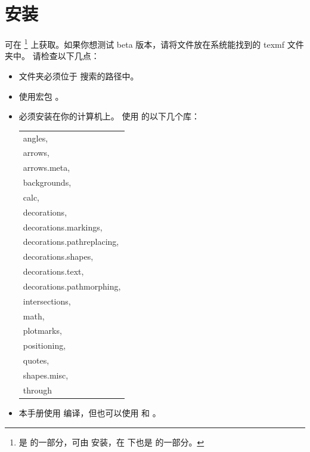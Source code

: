 \section{安装}

\tkzname{\tkznameofpack} 可在 \footnote{\tkzname{\tkznameofpack} 是  的一部分，可由  安装，在  下也是  的一部分。} 上获取。如果你想测试 beta 版本，请将文件放在系统能找到的 texmf 文件夹中。
请检查以下几点：

\begin{itemize}\setlength{\itemsep}{5pt}
\item \tkzname{\tkznameofpack} 文件夹必须位于  搜索的路径中。
\item \tkzname{\tkznameofpack} 使用宏包 。
\item \PGF 必须安装在你的计算机上。\tkzname{\tkznameofpack} 使用 \TIKZ 的以下几个库：

 \begin{tabular}{l}
    angles,                         \\
    arrows,                         \\
    arrows.meta,                    \\
    backgrounds,                    \\
    calc,                           \\
    decorations,                    \\
    decorations.markings,           \\
    decorations.pathreplacing,      \\
    decorations.shapes,             \\
    decorations.text,               \\
    decorations.pathmorphing,       \\
    intersections,                  \\
    math,                           \\
    plotmarks,                      \\
    positioning,                    \\
    quotes,                         \\
    shapes.misc,                    \\
    through
\end{tabular}

\item 本手册使用  编译，但也可以使用  和 。
\end{itemize}

\endinput
